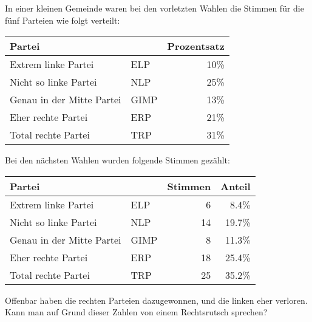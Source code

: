 In einer kleinen Gemeinde waren bei den vorletzten Wahlen die
Stimmen für die fünf Parteien wie folgt verteilt:
\begin{center}
\begin{tabular}{ll|r}
Partei                   &    &Prozentsatz\\
\hline
Extrem linke Partei      &ELP & 10\%\\
Nicht so linke Partei    &NLP & 25\%\\
Genau in der Mitte Partei&GIMP& 13\%\\
Eher rechte Partei       &ERP & 21\%\\
Total rechte Partei      &TRP & 31\%\\
\hline
\end{tabular}
\end{center}
Bei den nächsten Wahlen wurden folgende Stimmen gezählt:
\begin{center}
\begin{tabular}{ll|rr}
Partei                   &    &Stimmen&Anteil\\
\hline
Extrem linke Partei      &ELP &  6    & 8.4\%\\
Nicht so linke Partei    &NLP & 14    &19.7\%\\
Genau in der Mitte Partei&GIMP&  8    &11.3\%\\
Eher rechte Partei       &ERP & 18    &25.4\%\\
Total rechte Partei      &TRP & 25    &35.2\%\\
\hline
\end{tabular}
\end{center}
Offenbar haben die rechten Parteien dazugewonnen, und die linken
eher verloren.
Kann man auf Grund dieser Zahlen von einem Rechtsrutsch sprechen?


